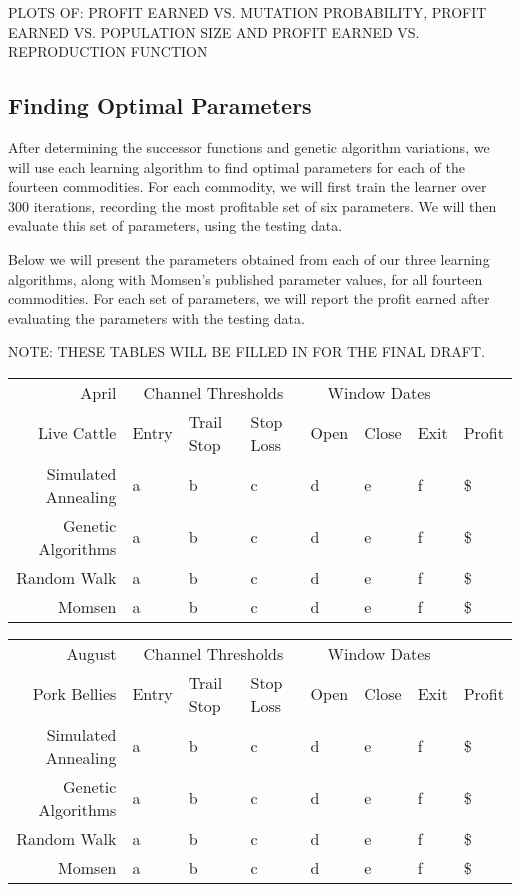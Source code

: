 \documentclass[12pt]{article}
\begin{document}
PLOTS OF: PROFIT EARNED VS. MUTATION PROBABILITY, PROFIT EARNED VS. POPULATION
SIZE AND PROFIT EARNED VS. REPRODUCTION FUNCTION



\subsection{Finding Optimal Parameters}


After determining the successor functions and genetic algorithm variations, we
will use each learning algorithm to find optimal parameters for each of the
fourteen commodities. For each commodity, we will first train the learner over
300 iterations, recording the most profitable set of six parameters. We will
then evaluate this set of parameters, using the testing data.

Below we will present the parameters obtained from each of our three learning
algorithms, along with Momsen's published parameter values, for all fourteen
commodities. For each set of parameters, we will report the profit earned after
evaluating the parameters with the testing data.


NOTE: THESE TABLES WILL BE FILLED IN FOR THE FINAL DRAFT.

\begin{tabular}{|r|l|l|l|l|l|l|l|}
  \hline
  April & \multicolumn{3}{|c|}{Channel Thresholds} & \multicolumn{3}{|c|}{Window Dates} &  \\
  Live Cattle & Entry & Trail Stop & Stop Loss & Open & Close & Exit & Profit\\ \hline
  Simulated Annealing & a & b & c & d & e & f & \$ \\ \hline
  Genetic Algorithms & a & b & c & d & e & f & \$ \\ \hline
  Random Walk & a & b & c & d & e & f & \$ \\ \hline
  Momsen &  a & b & c & d & e & f & \$ \\ \hline
\end{tabular}

\begin{tabular}{|r|l|l|l|l|l|l|l|}
  \hline
  August & \multicolumn{3}{|c|}{Channel Thresholds} & \multicolumn{3}{|c|}{Window Dates} &  \\
  Pork Bellies & Entry & Trail Stop & Stop Loss & Open & Close & Exit & Profit\\ \hline
  Simulated Annealing & a & b & c & d & e & f & \$ \\ \hline
  Genetic Algorithms & a & b & c & d & e & f & \$ \\ \hline
  Random Walk & a & b & c & d & e & f & \$ \\ \hline
  Momsen &  a & b & c & d & e & f & \$ \\ \hline
\end{tabular}
\end{document}
